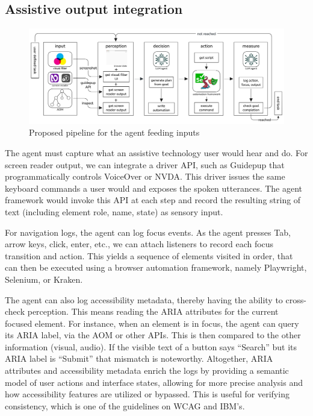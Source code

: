 \subsection{Assistive output integration}

\begin{figure}
    \centering
    \includegraphics[width=1\linewidth]{imgs/flow.png}
    \caption{Proposed pipeline for the agent feeding inputs}
    \vspace{-13pt}
\label{fig:pipeline}
\end{figure}

The agent must capture what an assistive technology user would hear and do. For screen reader output, we can integrate a driver API, such as Guidepup\cite{guidepup2025} that programmatically controls VoiceOver\cite{voiceover2024} or NVDA\cite{nvda2024}.
This driver issues the same keyboard commands a user would and exposes the spoken utterances\cite{guidepup2025}. The agent framework would invoke this API at each step and record the resulting string of text (including element role, name, state) as sensory input.


For navigation logs, the agent can log focus events. As the agent presses Tab, arrow keys, click, enter, etc., we can attach listeners to record each focus transition and action. This yields a sequence of elements visited in order, that can then be executed using a browser automation framework, namely Playwright\cite{playwright2025}, Selenium\cite{garcia2024selenium}, or Kraken\cite{ravelo2023kraken}.


The agent can also log accessibility metadata, thereby having the ability to cross-check perception. This means reading the ARIA attributes for the current focused element. For instance, when an element is in focus, the agent can query its ARIA label, via the \ac{AOM} or other APIs. This is then compared to the other information (visual, audio). If the visible text of a button says “Search” but its ARIA label is “Submit” that mismatch is noteworthy. Altogether, ARIA attributes and accessibility metadata enrich the logs by providing a semantic model of user actions and interface states, allowing for more precise analysis and how accessibility features are utilized or bypassed. This is useful for verifying consistency, which is one of the guidelines on \ac{WCAG} and IBM's\cite{ibm2025accessibility}. 

